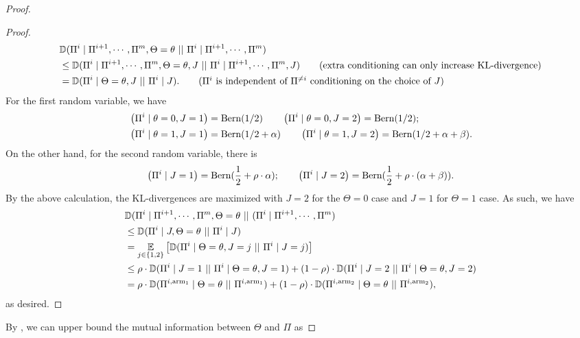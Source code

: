 \begin{proof}
\begin{proof}
		\begin{align*}
			& \kl{\Pi^{i} \mid \Pi^{i+1}, \cdots,\Pi^{m}, \Theta=\theta}{\Pi^{i} \mid \Pi^{i+1}, \cdots,\Pi^{m}} \\
			& \leq \kl{\Pi^{i} \mid \Pi^{i+1}, \cdots,\Pi^{m}, \Theta=\theta, J}{\Pi^{i} \mid \Pi^{i+1}, \cdots,\Pi^{m}, J}  \tag{extra conditioning can only increase KL-divergence}\\
			&= \kl{\Pi^{i} \mid  \Theta=\theta, J}{\Pi^{i} \mid J}. \tag{$\Pi^{i}$ is independent of $\Pi^{\neq i}$ conditioning on the choice of $J$}
		\end{align*}
		For the first random variable, we have
		\begin{align*}
			& \left(\Pi^{i} \mid \theta=0, J=1\right) = \textnormal{Bern}(1/2) \qquad \left(\Pi^{i} \mid \theta=0, J=2\right) = \textnormal{Bern}(1/2); \\
			& \left(\Pi^{i} \mid \theta=1, J=1\right) = \textnormal{Bern}(1/2+\alpha) \qquad \left(\Pi^{i} \mid \theta=1, J=2\right) = \textnormal{Bern}(1/2+\alpha+\beta).
		\end{align*}
		On the other hand, for the second random variable, there is
		\begin{align*}
			\left(\Pi^{i} \mid J=1\right) = \textnormal{Bern}(\frac{1}{2}+\rho \cdot \alpha); \qquad \left(\Pi^{i} \mid J=2\right) = \textnormal{Bern}(\frac{1}{2}+\rho \cdot (\alpha + \beta)).
		\end{align*}
		By the above calculation, the KL-divergences are maximized with $J=2$ for the $\Theta=0$ case and $J=1$ for $\Theta=1$ case. As such, we have
		\begin{align*}
			& \mathbb{D}(\Pi^{i} \mid \Pi^{i+1}, \cdots,\Pi^{m}, \Theta=\theta~||~(\Pi^{i} \mid \Pi^{i+1}, \cdots,\Pi^{m}) \\
			& \leq \mathbb{D}(\Pi^{i} \mid J, \Theta=\theta~||~\Pi^{i} \mid J)\\
			&= \operatorname*{{\mathbb{E}}}_{j\in \{1,2\}}\left[\mathbb{D}(\Pi^{i} \mid \Theta=\theta, J=j~||~\Pi^{i} \mid J=j)\right]\\
			& \leq \rho \cdot \mathbb{D}(\Pi^{i} \mid J=1~||~\Pi^{i} \mid \Theta=\theta, J=1) + (1-\rho) \cdot \mathbb{D}(\Pi^{i} \mid J=2~||~\Pi^{i} \mid \Theta=\theta, J=2) \\
			&= \rho \cdot \mathbb{D}(\Pi^{i, \textnormal{arm}_1}\mid \Theta = \theta~||~\Pi^{i, \textnormal{arm}_1}) + (1-\rho)\cdot \mathbb{D}(\Pi^{i, \textnormal{arm}_2}\mid \Theta = \theta~||~\Pi^{i, \textnormal{arm}_2}),
		\end{align*}
		as desired. 
	\end{proof}
	By , we can upper bound the mutual information between $\Theta$ and $\Pi$ as %

\end{proof}
